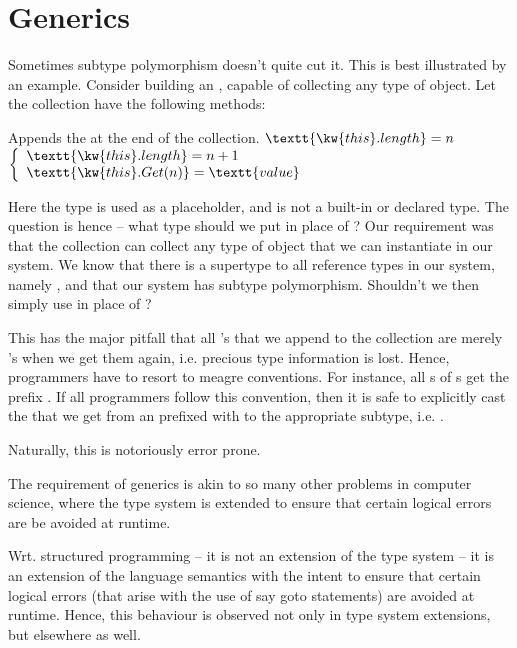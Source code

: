 \chapter{Generics}

Sometimes subtype polymorphism doesn't quite cut it. This is best illustrated
by an example. Consider building an , capable of
collecting any type of object. Let the collection have the following methods:

\begin{codebox}
\end{codebox}

\begin{codebox}
\zi Appends the  at the end of the collection.
\zi {} $\textt{\kw{this}.length} = n$
\zi {} $\left\{
\begin{array}{l}
\textt{\kw{this}.length} = n + 1\\
\textt{\kw{this}.Get(n)} = \textt{value}
\end{array}
\right.$
\end{codebox}

\begin{codebox}
\end{codebox}

Here the type  is used as a placeholder, and is not a built-in or
declared type.  The question is hence -- what type should we put in place of
? Our requirement was that the collection can collect any type of
object that we can instantiate in our system. We know that there is a supertype
to all reference types in our system, namely , and that our system
has subtype polymorphism.  Shouldn't we then simply use  in place
of ?

This has the major pitfall that all 's that we append to the
collection are merely 's when we get them again, i.e. precious
type information is lost. Hence, programmers have to resort to meagre
conventions. For instance, all s of s
get the prefix . If all programmers follow this
convention, then it is safe to explicitly cast the  that we get
from an  prefixed with  to the
appropriate subtype, i.e. .

Naturally, this is notoriously error prone.

\newpage


The requirement of generics is akin to so many other problems in computer
science, where the type system is extended to ensure that certain logical
errors are be avoided at runtime.

Wrt. structured programming -- it is not an extension of the type system -- it
is an extension of the language semantics with the intent to ensure that
certain logical errors (that arise with the use of say goto statements) are
avoided at runtime. Hence, this behaviour is observed not only in type system
extensions, but elsewhere as well.
